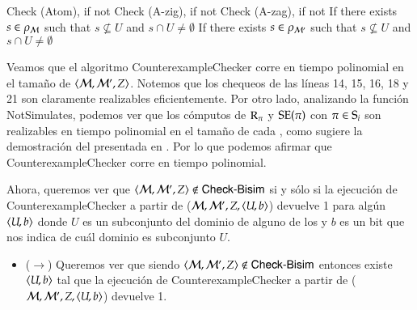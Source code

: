 \begin{demostracion}
\begin{algorithm}
\begin{algorithmic}[1]
            \vspace{1.5em}

                \State Check (Atom), if not 
                \State Check (A-zig), if not 
                \State Check (A-zag), if not 
                    \State If there exists $s \in \rho_\model$ such that $s \not\subseteq U$ and $s \cap U \neq \emptyset$ 
                    \State \Return {}
                \Else
                    \State If there exists $s \in \rho_{\model'}$ such that $s \not\subseteq U$ and $s \cap U \neq \emptyset$ 
                    \State \Return {} 
                \EndIf
            \EndFunction
        \end{algorithmic}
    \end{algorithm}

    Veamos que el algoritmo \textsf{CounterexampleChecker} corre en tiempo polinomial en el tamaño de 
    $\tup{\modults,\modults',Z}$. Notemos que los chequeos de las líneas 14, 15, 16, 18 y 21 son claramente realizables 
    eficientemente. Por otro lado, analizando la función \textsf{NotSimulates}, podemos ver que los cómputos de $\R_\pi$ y $\sexec(\pi)$ 
    con $\pi \in \S_i$ son realizables en tiempo polinomial en el tamaño de cada \ults, como sugiere la demostración del 
     presentada en \cite{ArecesFSV25,SaraviaPHD}. Por lo que podemos afirmar que 
    \textsf{CounterexampleChecker} corre en tiempo polinomial.
    
    Ahora, queremos ver que $\tup{\modults,\modults',Z} \not\in \CBisim$ si y sólo si
    la ejecución de \textsf{CounterexampleChecker} a partir de ($\modults,\modults',Z,\tup{U,b}$) devuelve 1 para 
    algún $\tup{U,b}$ donde $U$ es un subconjunto del dominio de alguno de los \ults y $b$ es un 
    bit que nos indica de cuál dominio es subconjunto $U$.

    \begin{itemize}
        \item ($\rightarrow$) Queremos ver que siendo  
        $\tup{\modults,\modults',Z} \not \in \CBisim$ entonces
        existe $\tup{U,b}$ tal que la ejecución de \textsf{CounterexampleChecker} a partir de ($\modults,\modults',Z,\tup{U,b}$) 
        devuelve 1.


\end{itemize}
\end{demostracion}
